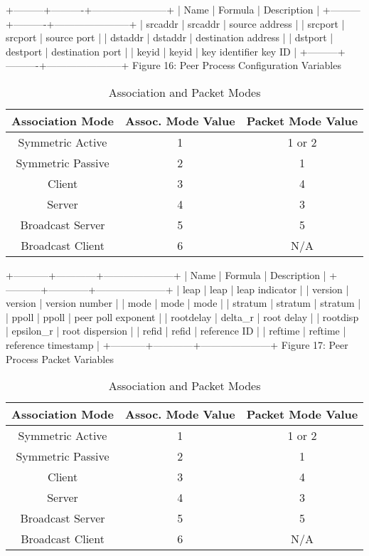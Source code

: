 +---------+----------+-----------------------+
| Name | Formula | Description |
+---------+----------+-----------------------+
| srcaddr | srcaddr | source address |
| srcport | srcport | source port |
| dstaddr | dstaddr | destination address |
| dstport | destport | destination port |
| keyid | keyid | key identifier key ID |
+---------+----------+-----------------------+
Figure 16: Peer Process Configuration Variables

\begin{table}[htb]
\center
\begin{tabular}{c | c | c}
Association Mode & Assoc. Mode Value & Packet Mode Value \\
\hline
\hline
Symmetric Active & 1 & 1 or 2 \\
Symmetric Passive & 2 & 1 \\
Client & 3 & 4 \\
Server & 4 & 3 \\
Broadcast Server & 5 & 5 \\
Broadcast Client & 6 & N/A \\
\hline
\end{tabular}
\label{association_and_packet_modes}
\caption{Association and Packet Modes}
\end{table}

+-----------+------------+---------------------+
| Name | Formula | Description |
+-----------+------------+---------------------+
| leap | leap | leap indicator |
| version | version | version number |
| mode | mode | mode |
| stratum | stratum | stratum |
| ppoll | ppoll | peer poll exponent |
| rootdelay | delta\_r | root delay |
| rootdisp | epsilon\_r | root dispersion |
| refid | refid | reference ID |
| reftime | reftime | reference timestamp |
+-----------+------------+---------------------+
Figure 17: Peer Process Packet Variables

\begin{table}[htb]
\center
\begin{tabular}{c | c | c}
Association Mode & Assoc. Mode Value & Packet Mode Value \\
\hline
\hline
Symmetric Active & 1 & 1 or 2 \\
Symmetric Passive & 2 & 1 \\
Client & 3 & 4 \\
Server & 4 & 3 \\
Broadcast Server & 5 & 5 \\
Broadcast Client & 6 & N/A \\
\hline
\end{tabular}
\label{association_and_packet_modes}
\caption{Association and Packet Modes}
\end{table}

